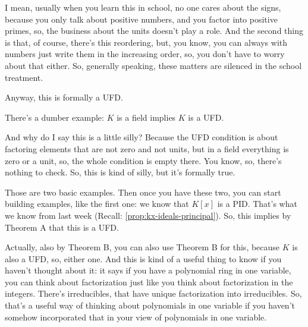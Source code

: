 \begin{speech}[00:18:35 - 00:20:20]
I mean, usually when you learn this in school, no one cares about the signs, because you only talk about positive numbers, and you factor into positive primes, so, the business about the units doesn't play a role. And the second thing is that, of course, there's this reordering, but, you know, you can always with numbers just write them in the increasing order, so, you don't have to worry about that either. So, generally speaking, these matters are silenced in the school treatment.

Anyway, this is formally a UFD.

There's a dumber example:  $K$ is a field implies $K$ is a UFD. 

And why do I say this is a little silly? Because the UFD condition is about factoring elements that are not zero and not units, but in a field everything is zero or a unit, so, the whole condition is empty there.  You know, so, there's nothing to check. So, this is kind of silly, but it's formally true.

Those are two basic examples. Then once you have these two, you can start building examples, like the first one: we know that $K[x]$ is a PID.  That's what we know from last week (Recall: \cref{prop:kx-ideals-principal}). So, this implies by Theorem A  that this is a UFD.

Actually, also by Theorem B,  you can also use Theorem B for this, because $K$ is also a UFD, so, either one. And this is kind of a useful thing to know if you haven't thought about it: it says if you have a polynomial ring in one variable, you can think about factorization just like you think about factorization in the integers. There's irreducibles, that have unique factorization into irreducibles. So, that's a useful way of thinking about polynomials in one variable if you haven't somehow incorporated that in your view of polynomials in one variable.
\end{speech}

